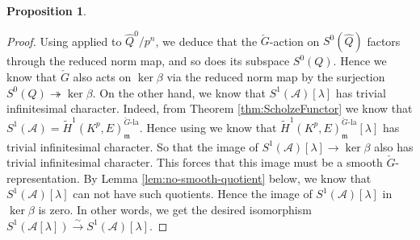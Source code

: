 \documentclass{article}
\theoremstyle{definition}
\newtheorem{proposition}[theorem]{Proposition}
\def\calA{\mathcal{A}}
\def\frm{\mathfrak{m}}
\def\surj{\twoheadrightarrow}
\def\aisom{\xrightarrow{\sim}}
\def\lan{\mathrm{la}}
\def\hat{\widehat}
\def\tilde{\widetilde}
\def\-{\text{-}}
\def\-{\text{-}}
\begin{document}
\begin{proposition}
\begin{proof}
Using \cite[Proposition 4.7]{Scholze2018LubinTate} applied to $\hat Q^0/p^n$, we deduce that the $\check{G}$-action on $S^0(\hat Q)$ factors through the reduced norm map, and so does its subspace $S^0(Q)$. Hence we know that $\check{G}$ also acts on $\ker \beta$ via the reduced norm map by the surjection $S^0(Q)\surj \ker \beta$. On the other hand, we know that $S^1(\calA)[\lambda]$ has trivial infinitesimal character. Indeed, from Theorem \ref{thm:ScholzeFunctor} we know that $S^1(\calA)=\tilde{H}^1(K^p,E)_{\frm}^{\check{G}\-\lan}$. Hence using \cite[Theorem 1.4]{dospinescu2025infinitesimal} we know that $\tilde{H}^1(K^p,E)_{\frm}^{\check{G}\-\lan}[\lambda]$ has trivial infinitesimal character. So that the image of $S^1(\calA)[\lambda]\to \ker \beta$ also has trivial infinitesimal character. This forces that this image must be a smooth $\check{G}$-representation. By Lemma \ref{lem:no-smooth-quotient} below, we know that $S^1(\calA)[\lambda]$ can not have such quotients. Hence the image of $S^1(\calA)[\lambda]$ in $\ker \beta$ is zero. In other words, we get the desired isomorphism $S^1(\calA[\lambda])\aisom  S^1(\calA)[\lambda].$
\end{proof}
\end{proposition}
\end{document}
